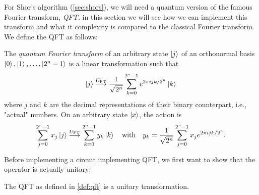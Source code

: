 		For Shor's algorithm (\autoref{sec:shors}), we will need a quantum version of the famous Fourier transform, \emph{\acf{QFT}.} in this section we will see how we can implement this transform and what it complexity is compared to the classical Fourier transform. We define the \ac{QFT} as follows:
		\begin{definition}  \label{def:qft}
			The \emph{quantum Fourier transform} of an arbitrary state \(\ket{j}\) of an orthonormal basis \( \ket{0}, \ket{1}, \dots, \ket{2^n - 1} \) is a linear transformation such that
			\begin{equation}
				\ket{j} \overset{U_\mathrm{FT}}{\longrightarrow} \frac{1}{\sqrt{2^n}} \sum_{k = 0}^{2^n - 1} e^{2 \pi i j k / 2^n} \ket{k}  \label{eq:qft}
			\end{equation}
			where \(j\) and \(k\) are the decimal representations of their binary counterpart, i.e., "actual" numbers. On an arbitrary state \(\ket{x}\), the action is
			\begin{equation}
				\sum_{j = 0}^{2^n - 1} x_j \ket{j} \overset{U_\mathrm{FT}}{\longrightarrow} \sum_{k = 0}^{2^n - 1} y_k \ket{k}
				\quad\text{with}\quad
				y_k = \frac{1}{\sqrt{2^n}} \sum_{j = 0}^{2^n - 1} x_j e^{2 \pi i j k / 2^n}.
			\end{equation}
		\end{definition}
		Before implementing a circuit implementing \ac{QFT}, we first want to show that the operator is actually unitary:
		\begin{theorem}
			The \acl{QFT} as defined in \autoref{def:qft} is a unitary transformation.
		\end{theorem}
